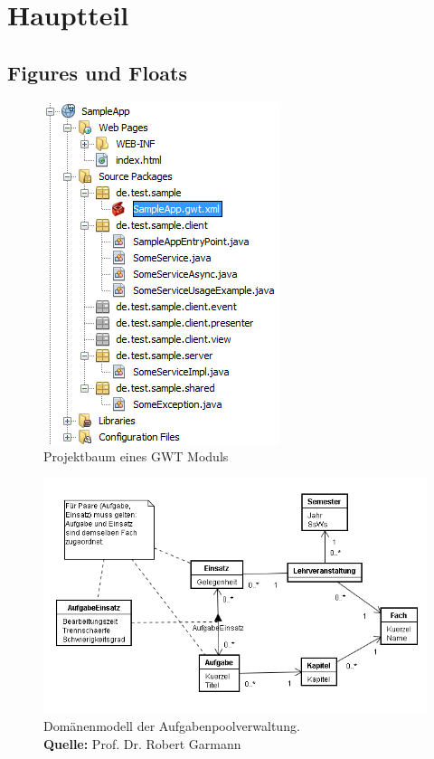\chapter{Hauptteil}
\section{Figures und Floats}
\begin{figure}
  \centering
	\includegraphics[]{figures/SampleAppProjektbaum}
    \caption{Projektbaum eines GWT Moduls}    
  \label{fig:projektbaum}
\end{figure}

\blindtext[2]

\begin{figure}[ht]
  \centering
	\includegraphics[width=\textwidth]{figures/DomainModel}
    \caption[Domänenmodell der Aufgabenpoolverwaltung]{Domänenmodell der Aufgabenpoolverwaltung.\\ \textbf{Quelle:} Prof. Dr. Robert Garmann}
  \label{fig:domainmodel}
\end{figure}

